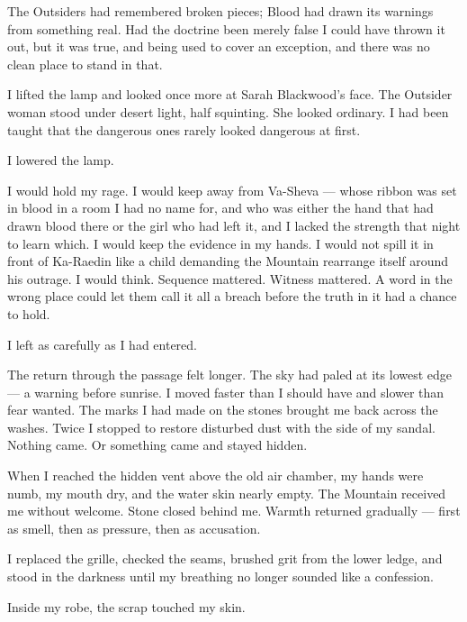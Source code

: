 The Outsiders had remembered broken pieces; Blood had drawn its warnings from something real. Had the doctrine been merely false I could have thrown it out, but it was true, and being used to cover an exception, and there was no clean place to stand in that.\par

I lifted the lamp and looked once more at Sarah Blackwood's face. The Outsider woman stood under desert light, half squinting. She looked ordinary. I had been taught that the dangerous ones rarely looked dangerous at first.\par

I lowered the lamp.\par

I would hold my rage. I would keep away from Va-Sheva --- whose ribbon was set in blood in a room I had no name for, and who was either the hand that had drawn blood there or the girl who had left it, and I lacked the strength that night to learn which. I would keep the evidence in my hands. I would not spill it in front of Ka-Raedin like a child demanding the Mountain rearrange itself around his outrage. I would think. Sequence mattered. Witness mattered. A word in the wrong place could let them call it all a breach before the truth in it had a chance to hold.\par

I left as carefully as I had entered.\par

The return through the passage felt longer. The sky had paled at its lowest edge --- a warning before sunrise. I moved faster than I should have and slower than fear wanted. The marks I had made on the stones brought me back across the washes. Twice I stopped to restore disturbed dust with the side of my sandal. Nothing came. Or something came and stayed hidden.\par

When I reached the hidden vent above the old air chamber, my hands were numb, my mouth dry, and the water skin nearly empty. The Mountain received me without welcome. Stone closed behind me. Warmth returned gradually --- first as smell, then as pressure, then as accusation.\par

I replaced the grille, checked the seams, brushed grit from the lower ledge, and stood in the darkness until my breathing no longer sounded like a confession.\par

Inside my robe, the scrap touched my skin.\par

